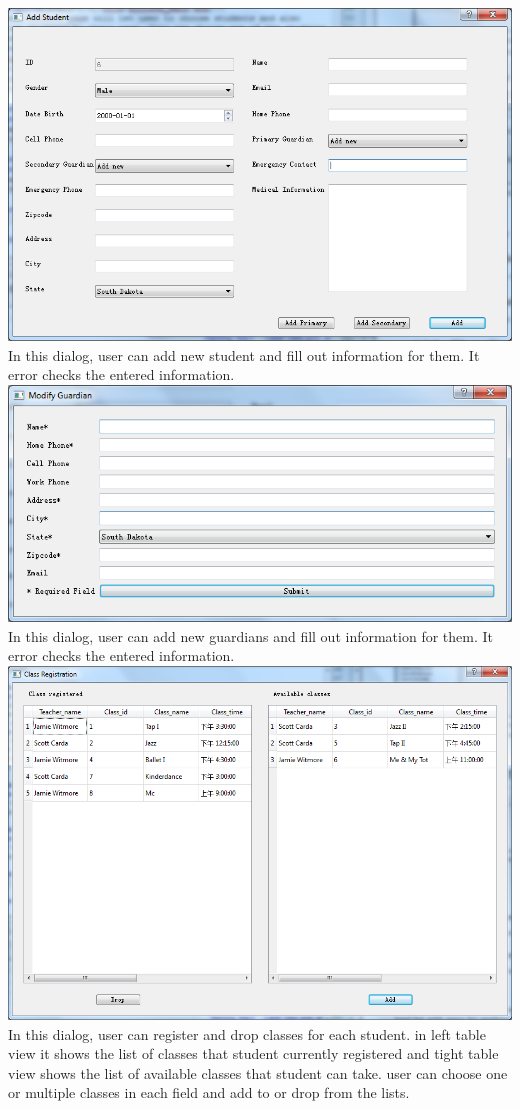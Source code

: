 \includegraphics[scale=0.5]{pics/reg_add.png}\\
In this dialog, user can add new student and fill out information for them. It error checks the entered information.\\
\includegraphics[scale=0.5]{pics/reg_add_gura.png}\\
In this dialog, user can add new guardians and fill out information for them. It error checks the entered information.\\
\includegraphics[scale=0.5]{pics/reg_list.png}\\
In this dialog, user can register and drop classes for each student. in left table view it shows the list of classes that student currently registered and tight table view shows the list of available classes that student can take. user can choose one or multiple classes in each field and add to or drop from the lists.

